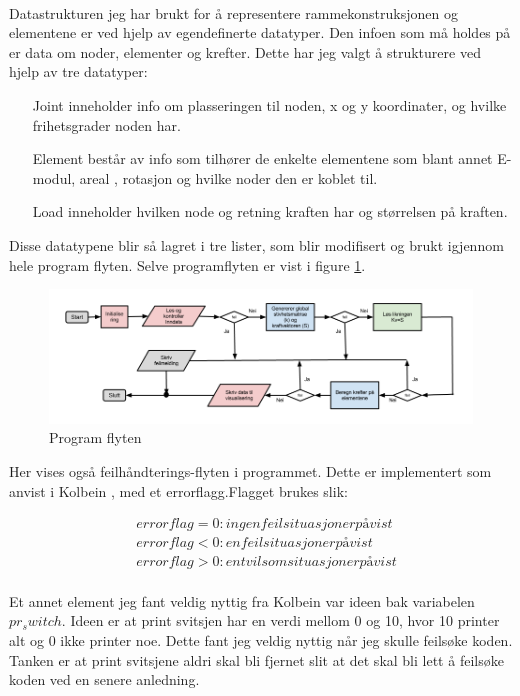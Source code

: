 \documentclass[10pt,a4paper, norsk]{article}
\begin{document}
\paragraph*{}
Datastrukturen jeg har brukt for å representere rammekonstruksjonen og elementene er ved hjelp av egendefinerte datatyper. Den infoen som må holdes på er data om noder, elementer og krefter. Dette har jeg valgt å strukturere ved hjelp av tre datatyper:

\begin{itemize}
\item[Joint] inneholder info om plasseringen til noden, x og y koordinater, og hvilke frihetsgrader noden har.
\item[Element] består av info som tilhører de enkelte elementene som blant annet E-modul, areal , rotasjon og hvilke noder den er koblet til.
\item[Load] inneholder hvilken node og retning kraften har og størrelsen på kraften.
\end{itemize} 

Disse datatypene blir så lagret i tre lister, som blir modifisert og brukt igjennom hele program flyten. Selve programflyten er vist i figure \ref{fig:flytF}. 

\begin{figure}[h]
\centering
\includegraphics[scale=0.5]{FEMFlowChart.png} 
\caption{Program flyten}
\label{fig:flytF}
\end{figure}

Her vises også feilhåndterings-flyten i programmet. Dette er implementert som anvist i Kolbein \cite{KolbeinBellProgram}, med et errorflagg.Flagget brukes slik:

\begin{align}
& errorflag = 0 : ingen feilsituasjon er påvist \nonumber\\
& errorflag < 0 : en feilsituasjon er påvist\nonumber\\
& errorflag > 0 : en tvilsom situasjon er påvist\nonumber 
\end{align}

\paragraph*{}
Et annet element jeg fant veldig nyttig fra Kolbein \cite{KolbeinBellProgram} var ideen bak variabelen $pr_switch$. Ideen er at print svitsjen har en verdi mellom 0 og 10, hvor 10 printer alt og 0 ikke printer noe. Dette fant jeg veldig nyttig når jeg skulle feilsøke koden. Tanken er at print svitsjene aldri skal bli fjernet slit at det skal bli lett å feilsøke koden ved en senere anledning.  
\end{document}
